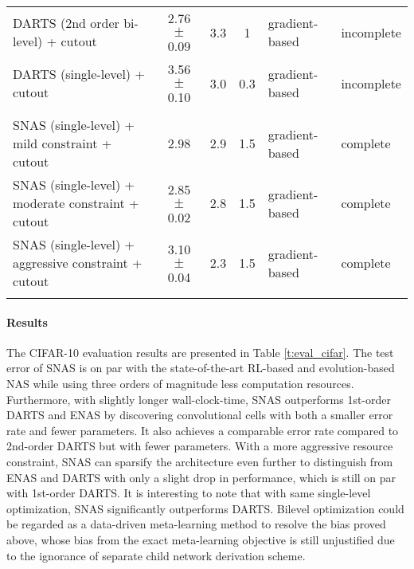 \documentclass{article} \usepackage{iclr2019_conference,times}
\newcommand{\zh}{\color{black}}
\begin{document}
\begin{table}[h]
\begin{center}
{\begin{tabular}{lcccll}
DARTS (2nd order bi-level) + cutout \citep{liu2018darts}   & 2.76 $\pm$ 0.09   &3.3   &1  &gradient-based &incomplete\\
DARTS (single-level) + cutout \citep{liu2018darts}      & 3.56 $\pm$ 0.10   &3.0   &0.3  &gradient-based &incomplete
\vspace{0.1cm}
\\ \hline \vspace{-0.2cm}\\
SNAS (single-level) + mild constraint + cutout   &2.98    &2.9     &1.5  &gradient-based &complete \\
SNAS (single-level) + moderate constraint + cutout   &2.85 $\pm$ 0.02    &2.8  &1.5  &gradient-based &complete \\
SNAS (single-level) + aggressive constraint + cutout  &{\zh 3.10 $\pm$ 0.04}    &2.3      &1.5  &gradient-based &complete
\vspace{0.1cm}
\\ \hline
\vspace{-0.5cm}
\end{tabular}}
\end{center}
\end{table}


\paragraph{Results}

The CIFAR-10 evaluation results are presented in Table \ref{t:eval_cifar}. The test error of SNAS is on par with the state-of-the-art RL-based and evolution-based NAS while using three orders of magnitude less computation resources. Furthermore, with slightly longer wall-clock-time, SNAS outperforms 1st-order DARTS and ENAS by discovering convolutional cells with both a smaller error rate and {\zh fewer} parameters. It also achieves a comparable error rate compared to 2nd-order DARTS but with {\zh fewer} parameters. With a more aggressive resource constraint, SNAS can sparsify the {\zh architecture} even further to distinguish from ENAS and DARTS with only a slight drop in performance, which is still on par with 1st-order DARTS. It is interesting to note that with same single-level optimization, SNAS significantly outperforms DARTS. Bilevel optimization could be regarded as a data-driven meta-learning method to resolve the bias proved above, whose bias from the exact meta-learning objective is still unjustified due to the ignorance of separate child network derivation scheme.
\end{document}
